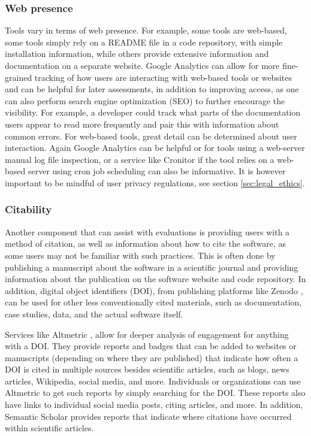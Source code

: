 \subsubsection{Web presence}
Tools vary in terms of web presence. For example, some tools are web-based, some tools simply rely on a README file in a code repository, with simple installation information, while others provide extensive information and documentation on a separate website. Google Analytics can allow for more fine-grained tracking of how users are interacting with web-based tools or websites and can be helpful for later assessments, in addition to improving access, as one can also perform search engine optimization (SEO) to further encourage the visibility. For example, a developer could track what parts of the documentation users appear to read more frequently and pair this with information about common errors. For web-based tools, great detail can be determined about user interaction. Again Google Analytics can be helpful or for tools using a web-server manual log file inspection, or a service like Cronitor \cite{cronitor}  if the tool relies on a web-based server using cron \cite{cron_2009} job scheduling can also be informative.  It is however important to be mindful of user privacy regulations, see section \ref{sec:legal_ethics}.

\subsubsection{Citability}
Another component that can assist with evaluations is providing users with a method of citation, as well as information about how to cite the software, as some users may not be familiar with such practices. This is often done by publishing a manuscript about the software in a scientific journal and providing information about the publication on the software website and code repository. In addition, digital object identifiers (DOI), from publishing platforms like Zenodo \cite{zenodo}, can be used for other less conventionally cited materials, such as documentation, case studies, data, and the actual software itself.

Services like Altmetric \cite{noauthor_altmetric_2015}, allow for deeper analysis of engagement for anything with a DOI. They provide reports and badges that can be added to websites or manuscripts (depending on where they are published) that indicate how often a DOI is cited in multiple sources besides scientific articles, such as blogs, news articles, Wikipedia, social media, and more.  Individuals or organizations can use Altmetric to get such reports by simply searching for the DOI. These reports also have links to individual social media posts, citing articles, and more. In addition, Semantic Scholar  \cite{noauthor_semantic_nodate} provides reports that indicate where citations have occurred within scientific articles. 


